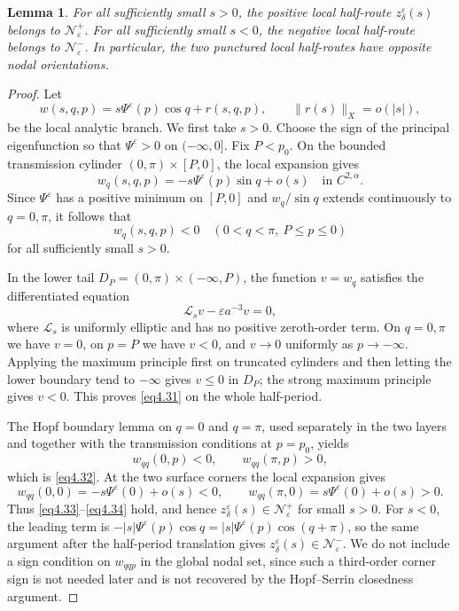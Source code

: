 \documentclass[11pt,reqno]{amsart}
\numberwithin{equation}{section}
\newtheorem{lemma}[theorem]{Lemma}
\theoremstyle{definition}
\theoremstyle{remark}
\begin{document}
\begin{lemma}\label{lem4.7}
For all sufficiently small $s>0$, the positive local half-route
$z_\delta^\varepsilon(s)$ belongs to $\mathcal N_\varepsilon^+$.
For all sufficiently small $s<0$, the negative local half-route
belongs to $\mathcal N_\varepsilon^-$.  In particular, the two
punctured local half-routes have opposite nodal orientations.
\end{lemma}
\begin{proof}
Let
\[
 w(s,q,p)=s\Psi^\varepsilon(p)\cos q+r(s,q,p),
 \qquad \|r(s)\|_X=o(|s|),
\]
be the local analytic branch.  We first take $s>0$.  Choose the sign of the principal
eigenfunction so that $\Psi^\varepsilon>0$ on $(-\infty,0]$.
Fix $P<p_0$.  On the bounded transmission cylinder
$(0,\pi)\times[P,0]$, the local expansion gives
\[
 w_q(s,q,p)=-s\Psi^\varepsilon(p)\sin q+o(s)
 \quad\text{in }C^{2,\alpha}.
\]
Since $\Psi^\varepsilon$ has a positive minimum on $[P,0]$ and
$w_q/\sin q$ extends continuously to $q=0,\pi$, it follows that
\[
 w_q(s,q,p)<0
 \quad(0<q<\pi,\ P\leq p\leq0)
\]
for all sufficiently small $s>0$.

In the lower tail $D_P=(0,\pi)\times(-\infty,P)$, the function
$v=w_q$ satisfies the differentiated equation
\[
 \mathscr L_s v-\varepsilon a^{-3}v=0,
\]
where $\mathscr L_s$ is uniformly elliptic and has no positive
zeroth-order term.  On $q=0,\pi$ we have $v=0$, on $p=P$ we have
$v<0$, and $v\to0$ uniformly as $p\to-\infty$.  Applying the maximum
principle first on truncated cylinders and then letting the lower
boundary tend to $-\infty$ gives $v\leq0$ in $D_P$; the strong
maximum principle gives $v<0$.  This proves \eqref{eq4.31} on the
whole half-period.

The Hopf boundary lemma on $q=0$ and $q=\pi$, used separately in the
two layers and together with the transmission conditions at
$p=p_0$, yields
\[
 w_{qq}(0,p)<0,
 \qquad
 w_{qq}(\pi,p)>0,
\]
which is \eqref{eq4.32}.  At the two surface corners the local
expansion gives
\[
 w_{qq}(0,0)=-s\Psi^\varepsilon(0)+o(s)<0,
 \qquad
 w_{qq}(\pi,0)=s\Psi^\varepsilon(0)+o(s)>0.
\]
Thus \eqref{eq4.33}--\eqref{eq4.34} hold, and hence
$z_\delta^\varepsilon(s)\in\mathcal N_\varepsilon^+$ for small
$s>0$.  For $s<0$, the leading term is
$-|s|\Psi^\varepsilon(p)\cos q
=|s|\Psi^\varepsilon(p)\cos(q+\pi)$, so the same argument after the
half-period translation gives
$z_\delta^\varepsilon(s)\in\mathcal N_\varepsilon^-$.  We do not
include a sign condition on $w_{qqp}$ in the global nodal set, since
such a third-order corner sign is not needed later and is not
recovered by the Hopf--Serrin closedness argument.
\end{proof}
\end{document}
